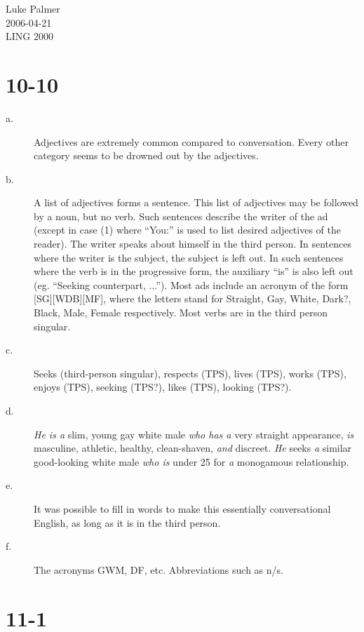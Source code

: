 \documentclass[12pt]{article}
\begin{document}
\noindent Luke Palmer \\
2006-04-21 \\
LING 2000

\section*{10-10}

\begin{description}
\item[a.] Adjectives are extremely common compared to conversation.
Every other category seems to be drowned out by the adjectives.

\item[b.] A list of adjectives forms a sentence.  This list of
adjectives may be followed by a noun, but no verb.  Such sentences
describe the writer of the ad (except in case (1) where ``You:'' is used
to list desired adjectives of the reader).  The writer speaks about
himself in the third person.  In sentences where the writer is the
subject, the subject is left out.  In such sentences where the verb is
in the progressive form, the auxiliary ``is'' is also left out (eg.
``Seeking counterpart, ...'').  Most ads include an acronym of the form
[SG][WDB][MF], where the letters stand for Straight, Gay, White, Dark?,
Black, Male, Female respectively.  Most verbs are in the third person
singular.

\item[c.] Seeks (third-person singular), respects (TPS), lives (TPS),
works (TPS), enjoys (TPS), seeking (TPS?), likes (TPS), looking (TPS?).

\item[d.] \textit{He is a} slim, young gay white male \textit{who has a}
very straight appearance, \textit{is} masculine, athletic, healthy,
clean-shaven, \textit{and} discreet.  \textit{He} seeks \textit{a}
similar good-looking white male \textit{who is} under 25 for \textit{a}
monogamous relationship.

\item[e.] It was possible to fill in words to make this essentially
conversational English, as long as it is in the third person.

\item[f.] The acronyms GWM, DF, etc. Abbreviations such as n/s.
\end{description}

\section*{11-1}
\end{document}
